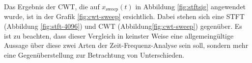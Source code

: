 Das Ergebnis der CWT, die auf $x_{\text{sweep}}(t)$ in Abbildung \ref{fig:stftsig} angewendet wurde, ist in der Grafik \ref{fig:cwt-sweep} ersichtlich. Dabei stehen sich eine STFT (Abbildung \ref{fig:stft-4096}) und CWT (Abbildung\ref{fig:cwt-sweep}) gegenüber. Es ist zu beachten, dass dieser Vergleich in keinster Weise eine allgemeingültige Aussage über diese zwei Arten der Zeit-Frequenz-Analyse sein soll, sondern mehr eine Gegenüberstellung zur Betrachtung von Unterschieden. 


